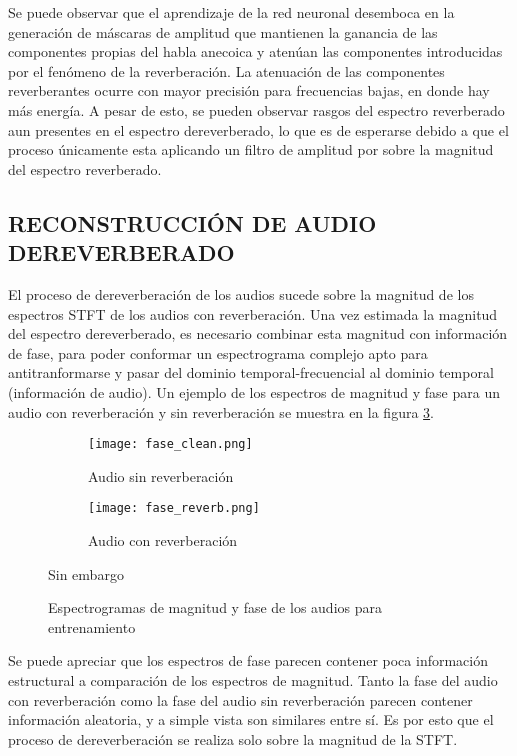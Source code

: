 Se puede observar que el aprendizaje de la red neuronal desemboca en la generación de máscaras de amplitud que mantienen la ganancia de las componentes propias del habla anecoica y atenúan las componentes introducidas por el fenómeno de la reverberación. La atenuación de las componentes reverberantes ocurre con mayor precisión para frecuencias bajas, en donde hay más energía. A pesar de esto, se pueden observar rasgos del espectro reverberado aun presentes en el espectro dereverberado, lo que es de esperarse debido a que el proceso únicamente esta aplicando un filtro de amplitud por sobre la magnitud del espectro reverberado.



\subsection[Reconstrucción de audio dereverberado]{RECONSTRUCCIÓN DE AUDIO DEREVERBERADO}
El proceso de dereverberación de los audios sucede sobre la magnitud de los espectros STFT de los audios con reverberación. Una vez estimada la magnitud del espectro dereverberado, es necesario combinar esta magnitud con información de fase, para poder conformar un espectrograma complejo apto para antitranformarse y pasar del dominio temporal-frecuencial al dominio temporal (información de audio). Un ejemplo de los espectros de magnitud y fase para un audio con reverberación y sin reverberación se muestra en la figura \ref{fig:fases}.

\begin{figure}[H]
\centering
\begin{subfigure}{.5\textwidth}
  \centering
  \texttt{[image: fase\_clean.png]}
  \caption{Audio sin reverberación}
  \label{fig:fase_sub1}
\end{subfigure}%
\begin{subfigure}{.5\textwidth}
  \centering
  \texttt{[image: fase\_reverb.png]}
  \caption{Audio con reverberación}
  \label{fig:fase_sub2}
\end{subfigure}Sin embargo
\caption{Espectrogramas de magnitud y fase de los audios para entrenamiento}
\label{fig:fases}
\end{figure} 

Se puede apreciar que los espectros de fase parecen contener poca información estructural a comparación de los espectros de magnitud. Tanto la fase del audio con reverberación como la fase del audio sin reverberación parecen contener información aleatoria, y a simple vista son similares entre sí. Es por esto que el proceso de dereverberación se realiza solo sobre la magnitud de la STFT. 


